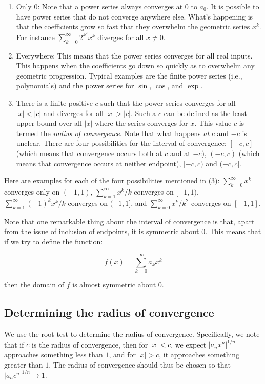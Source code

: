 \documentclass{amsart}
\begin{document}
\begin{enumerate}
\item Only $0$: Note that a power series always converges at $0$ to
  $a_0$. It is possible to have power series that do not converge
  anywhere else. What's happening is that the coefficients grow so
  fast that they overwhelm the geometric series $x^k$. For instance
  $\sum_{k=0}^\infty 2^{k^2}x^k$ diverges for all $x \ne 0$.
\item Everywhere: This means that the power series converges for all
  real inputs. This happens when the coefficients go down so quickly
  as to overwhelm any geometric progression. Typical examples are the
  finite power series (i.e., polynomials) and the power series for
  $\sin$, $\cos$, and $\exp$.
\item There is a finite positive $c$ such that the power series
  converges for all $|x| < |c|$ and diverges for all $|x| > |c|$. Such
  a $c$ can be defined as the least upper bound over all $|x|$ where
  the series converges for $x$. This value $c$ is termed the {\em radius
  of convergence}. Note that what happens {\em at} $c$ and $-c$ is
  unclear. There are four possibilities for the interval of
  convergence: $[-c,c]$ (which means that convergence occurs both at
  $c$ and at $-c$), $(-c,c)$ (which means that convergence occurs at
  neither endpoint), $[-c,c)$ and $(-c,c]$.
\end{enumerate}

Here are examples for each of the four possibilities mentioned in (3):
$\sum_{k=0}^\infty x^k$ converges only on $(-1,1)$, $\sum_{k=1}^\infty
x^k/k$ converges on $[-1,1)$, $\sum_{k=1}^\infty (-1)^k x^k/k$
converges on $(-1,1]$, and $\sum_{k=0}^\infty x^k/k^2$ converges on
$[-1,1]$. 

Note that one remarkable thing about the interval of convergence is
that, apart from the issue of inclusion of endpoints, it is symmetric
about $0$. This means that if we try to define the function:

$$f(x) = \sum_{k=0}^\infty a_kx^k$$

then the domain of $f$ is almost symmetric about $0$.

\subsection{Determining the radius of convergence}

We use the root test to determine the radius of
convergence. Specifically, we note that if $c$ is the radius of
convergence, then for $|x| < c$, we expect $|a_nx^n|^{1/n}$ approaches
something less than $1$, and for $|x| > c$, it approaches something
greater than $1$. The radius of convergence should thus be chosen so
that $|a_nc^n|^{1/n} \to 1$.
\end{document}
